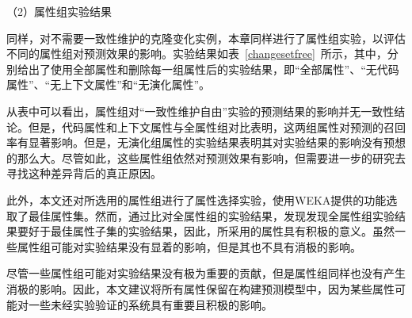 （2）属性组实验结果

同样，对不需要一致性维护的克隆变化实例，本章同样进行了属性组实验，以评估不同的属性组对预测效果的影响。实验结果如表~\ref{changesetfree}~所示，其中，分别给出了使用全部属性和删除每一组属性后的实验结果，即“全部属性”、“无代码属性”、“无上下文属性”和“无演化属性”。

从表中可以看出，属性组对“一致性维护自由”实验的预测结果的影响并无一致性结论。但是，代码属性和上下文属性与全属性组对比表明，这两组属性对预测的召回率有显著影响。但是，无演化组属性的实验结果表明其对实验结果的影响没有预想的那么大。尽管如此，这些属性组依然对预测效果有影响，但需要进一步的研究去寻找这种差异背后的真正原因。

此外，本文还对所选用的属性组进行了属性选择实验，使用WEKA提供的功能选取了最佳属性集。然而，通过比对全属性组的实验结果，发现发现全属性组实验结果要好于最佳属性子集的实验结果，因此，所采用的属性具有积极的意义。虽然一些属性组可能对实验结果没有显着的影响，但是其也不具有消极的影响。

尽管一些属性组可能对实验结果没有极为重要的贡献，但是属性组同样也没有产生消极的影响。因此，本文建议将所有属性保留在构建预测模型中，因为某些属性可能对一些未经实验验证的系统具有重要且积极的影响。

